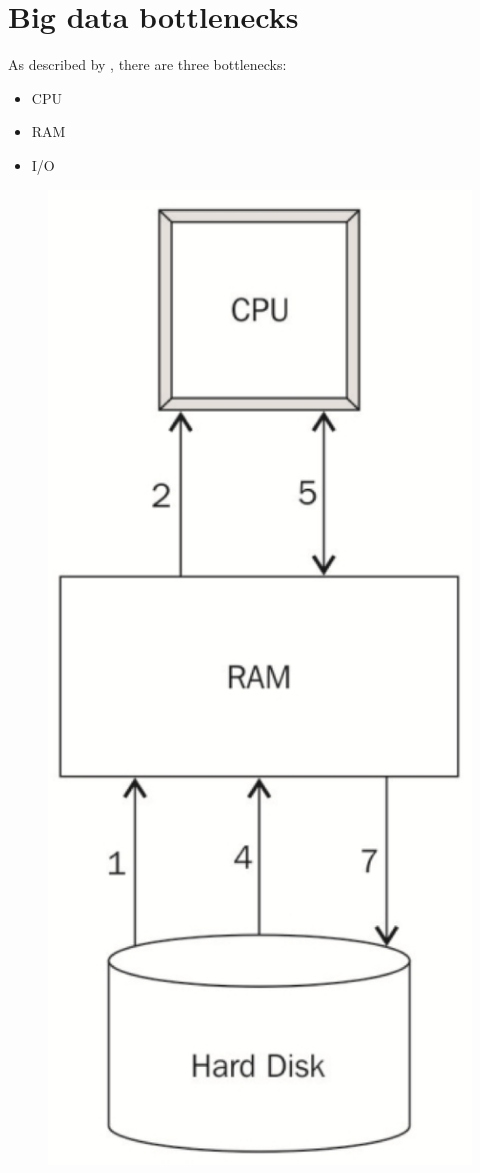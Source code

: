 \documentclass[]{book}
\providecommand{\tightlist}{%
  \setlength{\itemsep}{0pt}\setlength{\parskip}{0pt}}
\theoremstyle{definition}
\theoremstyle{definition}
\theoremstyle{definition}
\theoremstyle{remark}
\begin{document}
\section{Big data bottlenecks}\label{big-data-bottlenecks}

As described by \citet{Lim2015}, there are three bottlenecks:

\begin{itemize}
\tightlist
\item
  CPU
\item
  RAM
\item
  I/O
\end{itemize}

\begin{figure}

{\centering \includegraphics{images/ch1_bottlenecks} 

}
\end{figure}
\end{document}
